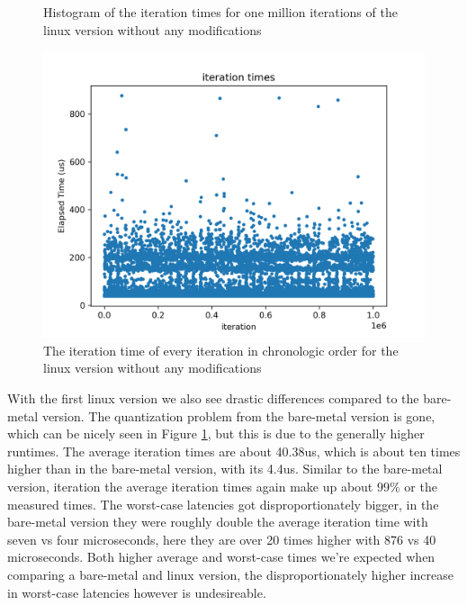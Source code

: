 \begin{figure}[h]
  \begin{center}
    \begin{minipage}{0.48\textwidth}
      \begin{center}
        \caption{Histogram of the iteration times for one million iterations of the linux version without any modifications}
        \label{fig:experiments:os-default:hist}
      \end{center}
    \end{minipage}
    \hspace{0.02\textwidth}
    \begin{minipage}{0.48\textwidth}
      \begin{center}
        \includegraphics[width=\textwidth]{assets/os-default/times.png}
        \caption{The iteration time of every iteration in chronologic order for the linux version without any modifications}
        \label{fig:experiments:os-default:times}
      \end{center}
    \end{minipage}
  \end{center}
\end{figure}

With the first linux version we also see drastic differences compared to the bare-metal version.
The quantization problem from the bare-metal version is gone, which can be nicely seen in Figure \ref{fig:experiments:os-default:times}, but this is due to the generally higher runtimes.
The average iteration times are about 40.38us, which is about ten times higher than in the bare-metal version, with its 4.4us.
Similar to the bare-metal version, iteration the average iteration times again make up about $99\%$ or the measured times.
The worst-case latencies got disproportionately bigger,
in the bare-metal version they were roughly double the average iteration time with seven vs four microseconds,
here they are over 20 times higher with 876 vs 40 microseconds.
Both higher average and worst-case times we're expected when comparing a bare-metal and linux version,
the disproportionately higher increase in worst-case latencies however is undesireable.

